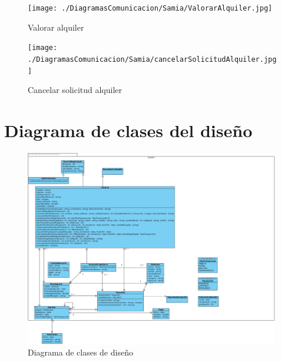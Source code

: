 \documentclass[11pt,spanish]{article} %
\begin{document}
\begin{figure}[H]
	\texttt{[image: ./DiagramasComunicacion/Samia/ValorarAlquiler.jpg]}
	\caption{Valorar alquiler}
\end{figure}

\begin{figure}[H]
	\texttt{[image: ./DiagramasComunicacion/Samia/cancelarSolicitudAlquiler.jpg]}
	\caption{Cancelar solicitud alquiler}
\end{figure}
\newpage



\section{Diagrama de clases del diseño}
\begin{figure}[H]
	\includegraphics[width=0.99\textwidth]{./DCD.jpg}
	\caption{Diagrama de clases de diseño}
\end{figure}
\end{document}
